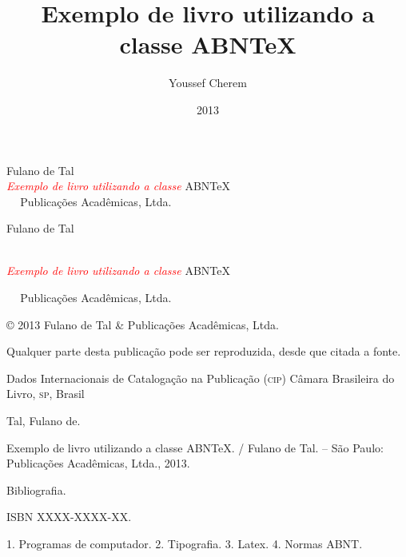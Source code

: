 \documentclass[11pt,a5paper]{memoir}
\title{Exemplo de livro utilizando a classe ABN\TeX}
\author{Youssef Cherem}
\date{2013}
\begin{document}
\begin{titlingpage}

\phantom{xxx}
\vspace{0.5cm}
\huge
\raggedright
Fulano de Tal\\
\vspace{2.5cm}
\Huge 
{\raggedleft
\textit{\textcolor{red}{Exemplo de livro utilizando a classe}} ABN\TeX\\[1cm]
}
\centering 

\vfill
\Large
 Publicações Acadêmicas, Ltda.

\end{titlingpage}

\begin{titlingpage}

\phantom{xxx}
\vspace{0.5cm}
\huge
{\raggedright
Fulano de Tal}\\
\vspace{2.5cm}
\Huge 
{
\raggedleft
\textit{\textcolor{red}{Exemplo de livro utilizando a classe}} ABN\TeX\\[1cm]
}

{\centering 

\vfill
\Large
 Publicações Acadêmicas, Ltda.
}

\clearpage
\footnotesize
© 2013 Fulano de Tal \& Publicações Acadêmicas, Ltda.

Qualquer parte desta publicação pode ser reproduzida, desde que citada a fonte.

\bigskip

\begin{center}
Dados Internacionais de Catalogação na Publicação (\textsc{cip})
Câmara Brasileira do Livro, \textsc{sp}, Brasil
\end{center}

\begin{mdframed}
\noindent Tal, Fulano de.

Exemplo de livro utilizando a classe ABN\TeX. / Fulano de Tal. -- São Paulo: Publicações Acadêmicas, Ltda., 2013.

\medskip

Bibliografia.

ISBN XXXX-XXXX-XX.

\medskip

1. Programas de computador. 2. Tipografia. 3. Latex. 4. Normas ABNT.

\end{mdframed}

\end{titlingpage}
\end{document}
